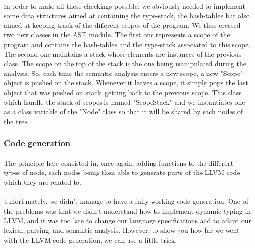 \documentclass[12pt,a4paper]{article}
\begin{document}
\paragraph{}
In order to make all these checkings possible, we obviously needed to implement some data structures aimed at containing the type-stack, the hash-tables but also aimed at keeping track of the different scopes of the program. We thus created two new classes in the AST module. The first one represents a scope of the program and contains the hash-tables and the type-stack associated to this scope. The second one maintains a stack whose elements are instances of the previous class. The scope on the top of the stack is the one being manipulated during the analysis. So, each time the semantic analysis enters a new scope, a new "Scope" object is pushed on the stack. Whenever it leaves a scope, it simply pops the last object that was pushed on stack, getting back to the previous scope. This class which handle the stack of scopes is named "ScopeStack" and we instantiates one as a class variable of the "Node" class so that it will be shared by each nodes of the tree. 

\subsubsection{Code generation} \label{cg}

\paragraph{}
The principle here consisted in, once again, adding functions to the different types of node, each nodes being then able to generate parts of the LLVM code which they are related to.  

\paragraph{}
Unfortunately, we didn't manage to have a fully working code generation. One of the problems was that we didn't understand how to implement dynamic typing in LLVM, and it was too late to change our language specifications and to adapt our lexical, parsing, and semantic analysis. However, to show you how far we went with the LLVM code generation, we can use a little trick. 
\end{document}
